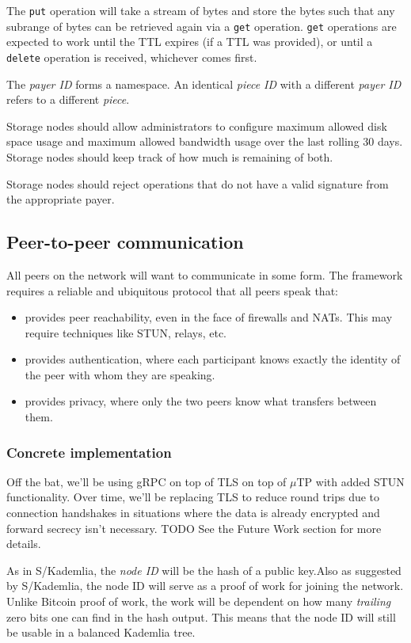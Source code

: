 \documentclass[a4paper,10pt]{article}
\newcommand{\code}[1]{{\tt #1}}
\newcommand{\todo}[1]{{\color{red} TODO #1}}
\begin{document}
The \code{put} operation will take a stream of bytes and store the bytes such
that any subrange of bytes can be retrieved again via a \code{get} operation.
\code{get} operations are expected to work until the TTL expires (if a TTL was
provided), or until a \code{delete} operation is received, whichever comes
first.

The {\em payer ID} forms a namespace. An identical {\em piece ID} with a
different {\em payer ID} refers to a different {\em piece}.

Storage nodes should allow administrators to configure maximum allowed disk
space usage and maximum allowed bandwidth usage over the last rolling 30 days.
Storage nodes should keep track of how much is remaining of both.

Storage nodes should reject operations that do not have a valid signature from
the appropriate payer.

\subsection{Peer-to-peer communication}

All peers on the network will want to communicate in some form. The framework
requires a reliable and ubiquitous protocol that all peers speak that:

\begin{itemize}
\item provides peer reachability, even in the face of firewalls and NATs. This
 may require techniques like STUN, relays, etc.
\item provides authentication, where each participant knows exactly the
 identity of the peer with whom they are speaking.
\item provides privacy, where only the two peers know what transfers between
 them.
\end{itemize}

\subsubsection{Concrete implementation}

Off the bat, we'll be using gRPC\cite{grpc} on top of TLS on top of
$\mu$TP\cite{utp} with added STUN functionality. Over time, we'll be
replacing TLS to reduce round trips due to connection handshakes in situations
where the data is already encrypted and forward secrecy isn't necessary.
\todo{} See the Future Work section for more details.

As in S/Kademlia\cite{skad}, the {\em node ID} will be the hash of a
public key.Also as suggested by S/Kademlia, the node ID will serve as a proof
of work for joining the network. Unlike Bitcoin proof of work\cite{bitcoin},
the work will be dependent on how many {\em trailing} zero bits one can find in
the hash output. This means that the node ID will still be usable in a balanced
Kademlia\cite{kad} tree.
\end{document}
